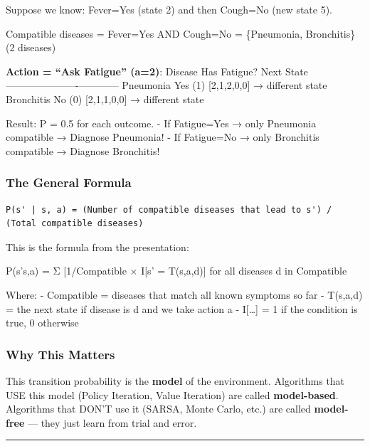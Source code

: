 \documentclass[
]{article}
\begin{document}
Suppose we know: Fever=Yes (state 2) and then Cough=No (new state 5).

Compatible diseases = Fever=Yes AND Cough=No = \{Pneumonia, Bronchitis\}
(2 diseases)

\textbf{Action = ``Ask Fatigue'' (a=2)}: \textbar{} Disease \textbar{}
Has Fatigue? \textbar{} Next State \textbar{}
\textbar---------\textbar-------------\textbar------------\textbar{}
\textbar{} Pneumonia \textbar{} Yes (1) \textbar{} {[}2,1,2,0,0{]} →
different state \textbar{} \textbar{} Bronchitis \textbar{} No (0)
\textbar{} {[}2,1,1,0,0{]} → different state \textbar{}

Result: P = 0.5 for each outcome. - If Fatigue=Yes → only Pneumonia
compatible → Diagnose Pneumonia! - If Fatigue=No → only Bronchitis
compatible → Diagnose Bronchitis!

\hypertarget{the-general-formula}{%
\subsubsection{The General Formula}\label{the-general-formula}}

\begin{verbatim}
P(s' | s, a) = (Number of compatible diseases that lead to s') / (Total compatible diseases)
\end{verbatim}

This is the formula from the presentation:

P(s'\textbar s,a) = Σ {[}1/\textbar Compatible\textbar{]} × I{[}s' =
T(s,a,d){]} for all diseases d in Compatible

Where: - Compatible = diseases that match all known symptoms so far -
T(s,a,d) = the next state if disease is d and we take action a -
I{[}\ldots{]} = 1 if the condition is true, 0 otherwise

\hypertarget{why-this-matters}{%
\subsubsection{Why This Matters}\label{why-this-matters}}

This transition probability is the \textbf{model} of the environment.
Algorithms that USE this model (Policy Iteration, Value Iteration) are
called \textbf{model-based}. Algorithms that DON'T use it (SARSA, Monte
Carlo, etc.) are called \textbf{model-free} --- they just learn from
trial and error.

\begin{center}\rule{0.5\linewidth}{0.5pt}\end{center}
\end{document}
